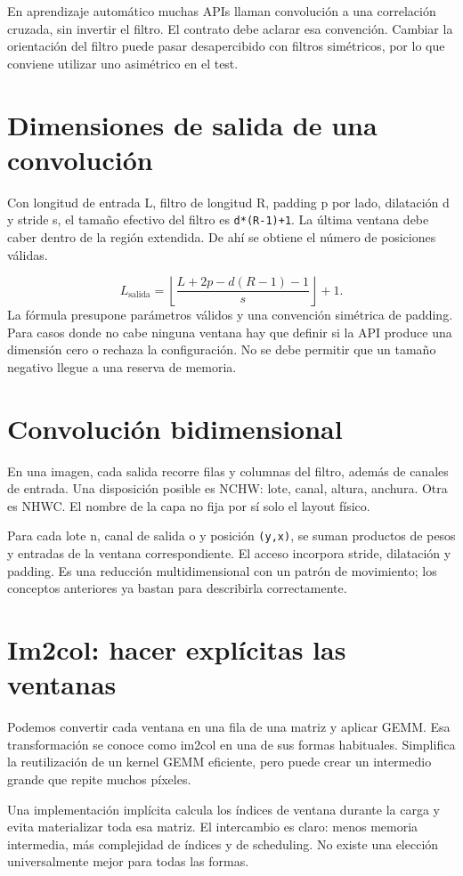 \documentclass[12pt,a4paper,oneside]{report}
\begin{document}
En aprendizaje automático muchas APIs llaman convolución a una correlación cruzada, sin invertir el filtro. El contrato debe aclarar esa convención. Cambiar la orientación del filtro puede pasar desapercibido con filtros simétricos, por lo que conviene utilizar uno asimétrico en el test.

\section{Dimensiones de salida de una convolución}
Con longitud de entrada L, filtro de longitud R, padding p por lado, dilatación d y stride s, el tamaño efectivo del filtro es \texttt{d*(R-1)+1}. La última ventana debe caber dentro de la región extendida. De ahí se obtiene el número de posiciones válidas.

\[
L_{\text{salida}}=
\left\lfloor\frac{L+2p-d(R-1)-1}{s}\right\rfloor+1.
\]
La fórmula presupone parámetros válidos y una convención simétrica de padding. Para casos donde no cabe ninguna ventana hay que definir si la API produce una dimensión cero o rechaza la configuración. No se debe permitir que un tamaño negativo llegue a una reserva de memoria.

\section{Convolución bidimensional}
En una imagen, cada salida recorre filas y columnas del filtro, además de canales de entrada. Una disposición posible es NCHW: lote, canal, altura, anchura. Otra es NHWC. El nombre de la capa no fija por sí solo el layout físico.

Para cada lote n, canal de salida o y posición \texttt{(y,x)}, se suman productos de pesos y entradas de la ventana correspondiente. El acceso incorpora stride, dilatación y padding. Es una reducción multidimensional con un patrón de movimiento; los conceptos anteriores ya bastan para describirla correctamente.

\section{Im2col: hacer explícitas las ventanas}
Podemos convertir cada ventana en una fila de una matriz y aplicar GEMM. Esa transformación se conoce como im2col en una de sus formas habituales. Simplifica la reutilización de un kernel GEMM eficiente, pero puede crear un intermedio grande que repite muchos píxeles.

Una implementación implícita calcula los índices de ventana durante la carga y evita materializar toda esa matriz. El intercambio es claro: menos memoria intermedia, más complejidad de índices y de scheduling. No existe una elección universalmente mejor para todas las formas.
\end{document}
